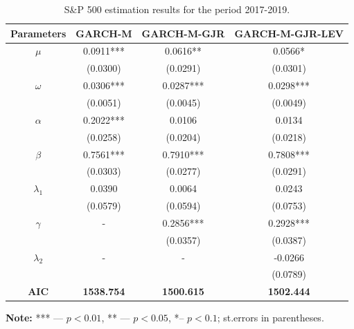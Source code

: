 \documentclass[authoryear, 1p]{elsarticle}
\numberwithin{equation}{section}
\begin{document}
\begin{table}[h!]
\begin{center}
\caption{S\&P 500 estimation results for the period 2017-2019.}
\label{tab:tab_7}
\begin{tabular*}{\textwidth}{cccc}
\hline
\hline
\textbf{Parameters} & \textbf{GARCH-M}  & \textbf{GARCH-M-GJR} & \textbf{GARCH-M-GJR-LEV} \\
\hline
\hline
$\mu$                  & 0.0911***         & 0.0616**             & 0.0566*                  \\
                    & (0.0300)          & (0.0291)             & (0.0301)                 \\
$\omega$               & 0.0306***         & 0.0287***            & 0.0298***                \\
                    & (0.0051)          & (0.0045)             & (0.0049)                 \\
$\alpha$               & 0.2022***         & 0.0106               & 0.0134                   \\
                    & (0.0258)          & (0.0204)             & (0.0218)                 \\
$\beta$                & 0.7561***         & 0.7910***            & 0.7808***                \\
                    & (0.0303)          & (0.0277)             & (0.0291)                 \\
$\lambda_{1}$              & 0.0390            & 0.0064               & 0.0243                   \\
                    & (0.0579)          & (0.0594)             & (0.0753)                 \\
$\gamma$               & -                 & 0.2856***            & 0.2928***                \\
                    &                   & (0.0357)             & (0.0387)                 \\
$\lambda_{2}$           & -                 & -                    & -0.0266                  \\
                        &                   &             & (0.0789)                     \\
\hline
\textbf{AIC}        & \textbf{1538.754} & \textbf{1500.615}    & \textbf{1502.444}        \\
\hline
\hline
\end{tabular*}
\end{center}
\footnotesize
\renewcommand{\baselineskip}{11pt}
\textbf{Note:} *** —  $p<0.01$, ** —  $p < 0.05$, *– $p < 0.1$; st.errors in parentheses.
\end{table}
\end{document}
